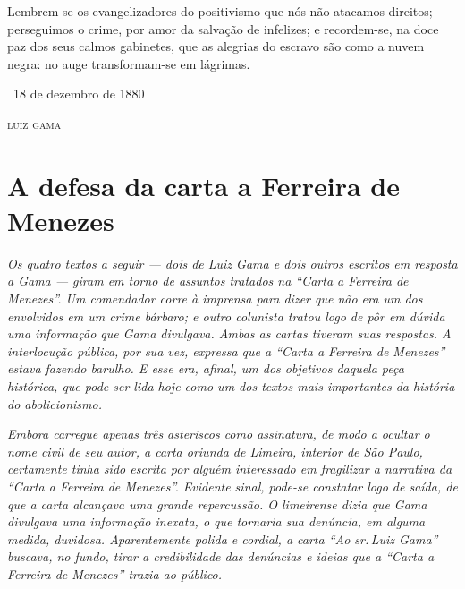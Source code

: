 Lembrem-se os evangelizadores do positivismo que nós não atacamos
direitos; perseguimos o crime, por amor da salvação de infelizes; e
recordem-se, na doce paz dos seus calmos gabinetes, que as alegrias do
escravo são como a nuvem negra: no auge transformam-se em lágrimas.

\medskip

\hfill\ 18 de dezembro de 1880

\hfill\textsc{luiz gama}

\part{A defesa da carta a Ferreira de Menezes}

\begin{didas}
\emph{Os quatro textos a seguir --- dois de Luiz Gama e dois outros
escritos em resposta a Gama --- giram em torno de assuntos tratados na
``Carta a Ferreira de Menezes''. Um comendador corre à imprensa para
dizer que não era um dos envolvidos em um crime bárbaro; e outro
colunista tratou logo de pôr em dúvida uma informação que Gama
divulgava. Ambas as cartas tiveram suas respostas. A interlocução
pública, por sua vez, expressa que a ``Carta a Ferreira de Menezes''
estava fazendo barulho. E esse era, afinal, um dos objetivos
daquela peça histórica, que pode ser lida hoje como um dos textos mais
importantes da história do abolicionismo.}
\end{didas}


\begin{resumo}
\emph{Embora carregue apenas três asteriscos como assinatura, de modo a
ocultar o nome civil de seu autor, a carta oriunda de Limeira, interior
de São Paulo, certamente tinha sido escrita por alguém interessado em
fragilizar a narrativa da ``Carta a Ferreira de Menezes''. Evidente
sinal, pode-se constatar logo de saída, de que a carta alcançava uma
grande repercussão. O limeirense dizia que Gama divulgava uma informação
inexata, o que tornaria sua denúncia, em alguma medida, duvidosa.
Aparentemente polida e cordial, a carta ``Ao sr.\,Luiz Gama'' buscava, no
fundo, tirar a credibilidade das denúncias e ideias que a ``Carta a
Ferreira de Menezes'' trazia ao público. }
\end{resumo}

